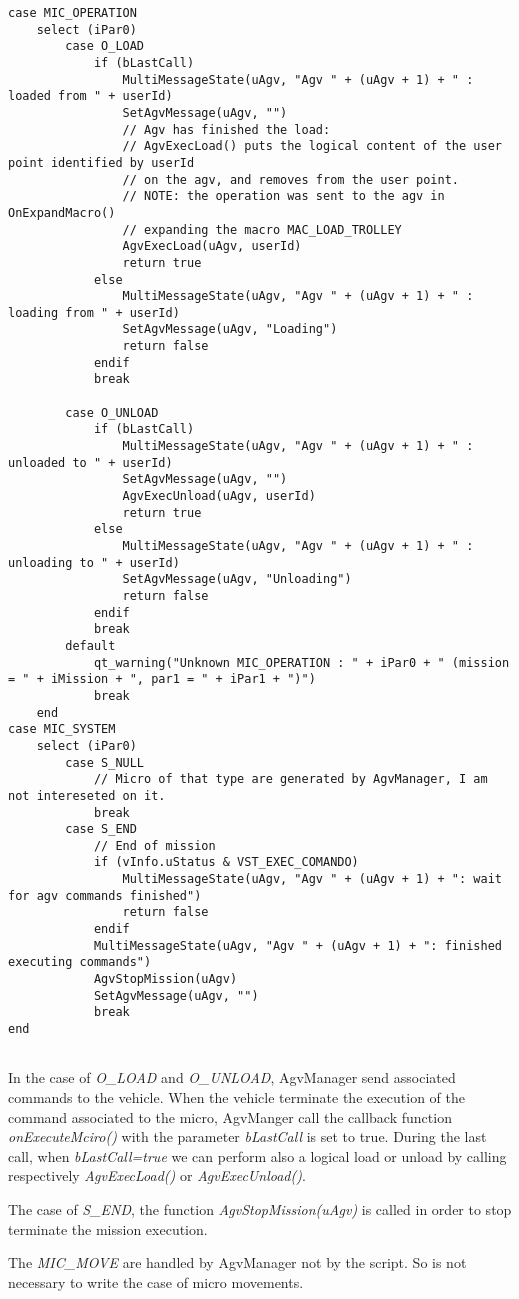 \begin{lstlisting}
case MIC_OPERATION
	select (iPar0)
		case O_LOAD
			if (bLastCall)
				MultiMessageState(uAgv, "Agv " + (uAgv + 1) + " : loaded from " + userId)
				SetAgvMessage(uAgv, "")
				// Agv has finished the load:
				// AgvExecLoad() puts the logical content of the user point identified by userId
				// on the agv, and removes from the user point.
				// NOTE: the operation was sent to the agv in OnExpandMacro()
				// expanding the macro MAC_LOAD_TROLLEY
				AgvExecLoad(uAgv, userId)
				return true
			else
				MultiMessageState(uAgv, "Agv " + (uAgv + 1) + " : loading from " + userId)
				SetAgvMessage(uAgv, "Loading")
				return false
			endif
			break
	
		case O_UNLOAD
			if (bLastCall)
				MultiMessageState(uAgv, "Agv " + (uAgv + 1) + " : unloaded to " + userId)
				SetAgvMessage(uAgv, "")
				AgvExecUnload(uAgv, userId)
				return true
			else
				MultiMessageState(uAgv, "Agv " + (uAgv + 1) + " : unloading to " + userId)
				SetAgvMessage(uAgv, "Unloading")
				return false
			endif
			break
		default
			qt_warning("Unknown MIC_OPERATION : " + iPar0 + " (mission = " + iMission + ", par1 = " + iPar1 + ")")
			break
	end
case MIC_SYSTEM
	select (iPar0)
		case S_NULL
			// Micro of that type are generated by AgvManager, I am not intereseted on it.
			break
		case S_END
			// End of mission
			if (vInfo.uStatus & VST_EXEC_COMANDO)
				MultiMessageState(uAgv, "Agv " + (uAgv + 1) + ": wait for agv commands finished")
				return false
			endif
			MultiMessageState(uAgv, "Agv " + (uAgv + 1) + ": finished executing commands")
			AgvStopMission(uAgv)
			SetAgvMessage(uAgv, "")
			break
end
	
\end{lstlisting}

In the case of \textit{O\_LOAD} and \textit{O\_UNLOAD}, AgvManager send associated commands to the vehicle. When the vehicle terminate the execution of the command associated to the micro, AgvManger call the callback function \textit{onExecuteMciro()} with the parameter \textit{bLastCall} is set to true. During the last call, when \textit{bLastCall=true} we can perform also a logical load or unload by calling respectively \textit{AgvExecLoad()} or \textit{AgvExecUnload()}.

The case of \textit{S\_END}, the function \textit{AgvStopMission(uAgv)} is called in order to stop terminate the mission execution.

The \textit{MIC\_MOVE} are handled by AgvManager not by the script. So is not necessary to write the case of micro movements.

